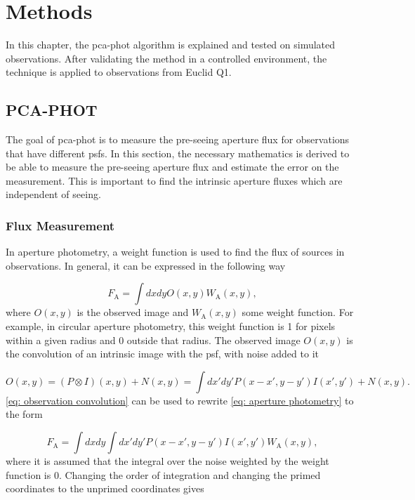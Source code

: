 \chapter{Methods}\label{ch: Methods}

In this chapter, the \gls{pca-phot} algorithm is explained and tested on simulated observations. After validating the method in a controlled environment, the technique is applied to observations from Euclid Q1. 


\section{PCA-PHOT}

The goal of \gls{pca-phot} is to measure the pre-seeing aperture flux for observations that have different \glspl{psf}. In this section, the necessary mathematics is derived to be able to measure the pre-seeing aperture flux and estimate the error on the measurement. This is important to find the intrinsic aperture fluxes which are independent of seeing. 


\subsection{Flux Measurement}\label{subsec: flux measurement}

In aperture photometry, a weight function is used to find the flux of sources in observations. In general, it can be expressed in the following way

\begin{equation}\label{eq: aperture photometry}
    F_\mathrm{A} = \int dxdyO(x,y)W_\mathrm{A}(x,y),
\end{equation}
where $O(x,y)$ is the observed image and $W_\mathrm{A}(x,y)$ some weight function. For example, in circular aperture photometry, this weight function is 1 for pixels within a given radius and 0 outside that radius. The observed image $O(x,y)$ is the convolution of an intrinsic image with the \gls{psf}, with noise added to it

\begin{equation}\label{eq: observation convolution}
    O(x,y)=(P\otimes I)(x,y)+N(x,y) = \int dx'dy'P(x-x', y-y')I(x',y')+N(x,y).
\end{equation}
\autoref{eq: observation convolution} can be used to rewrite \autoref{eq: aperture photometry} to the form

\begin{equation}
    F_\mathrm{A} = \int dxdy\int dx'dy'P(x-x', y-y')I(x',y')W_\mathrm{A}(x,y),
\end{equation}
where it is assumed that the integral over the noise weighted by the weight function is 0.
Changing the order of integration and changing the primed coordinates to the unprimed coordinates gives

